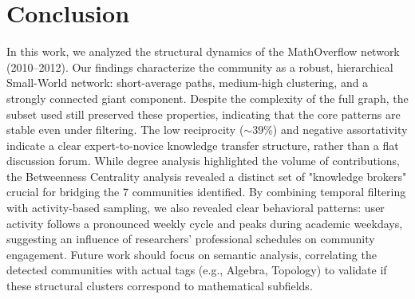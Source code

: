 \documentclass[sigplan]{acmart}
\begin{document}
\section{Conclusion}\label{sec:conclusion}
In this work, we analyzed the structural dynamics of the MathOverflow network (2010–2012). Our findings characterize the community as a robust, hierarchical Small-World network: short-average paths, medium-high clustering, and a strongly connected giant component. Despite the complexity of the full graph, the subset used still preserved these properties, indicating that the core patterns are stable even under filtering. The low reciprocity ($\sim 39\%$) and negative assortativity indicate a clear expert-to-novice knowledge transfer structure, rather than a flat discussion forum. While degree analysis highlighted the volume of contributions, the Betweenness Centrality analysis revealed a distinct set of "knowledge brokers" crucial for bridging the 7 communities identified. By combining temporal filtering with activity-based sampling, we also revealed clear behavioral patterns: user activity follows a pronounced weekly cycle and peaks during academic weekdays, suggesting an influence of researchers' professional schedules on community engagement. Future work should focus on semantic analysis, correlating the detected communities with actual tags (e.g., Algebra, Topology) to validate if these structural clusters correspond to mathematical subfields.




\end{document}
